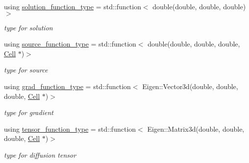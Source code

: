 \begin{DoxyCompactItemize}
\item 
\mbox{\label{classHArDCore3D_1_1HHO__Diffusion_a1fa6e03a7ffd6cb0c8a38b34eda2bd27}} 
using \hyperlink{classHArDCore3D_1_1HHO__Diffusion_a1fa6e03a7ffd6cb0c8a38b34eda2bd27}{solution\+\_\+function\+\_\+type} = std\+::function$<$ double(double, double, double)$>$
\begin{DoxyCompactList}\small\item\em type for solution \end{DoxyCompactList}\item 
\mbox{\label{classHArDCore3D_1_1HHO__Diffusion_a868fb4b88efbf1b77a712706d616b8d1}} 
using \hyperlink{classHArDCore3D_1_1HHO__Diffusion_a868fb4b88efbf1b77a712706d616b8d1}{source\+\_\+function\+\_\+type} = std\+::function$<$ double(double, double, double, \hyperlink{classHArDCore3D_1_1Cell}{Cell} $\ast$)$>$
\begin{DoxyCompactList}\small\item\em type for source \end{DoxyCompactList}\item 
\mbox{\label{classHArDCore3D_1_1HHO__Diffusion_afd0b6d7ab35bca58a5f7ec29afbba355}} 
using \hyperlink{classHArDCore3D_1_1HHO__Diffusion_afd0b6d7ab35bca58a5f7ec29afbba355}{grad\+\_\+function\+\_\+type} = std\+::function$<$ Eigen\+::\+Vector3d(double, double, double, \hyperlink{classHArDCore3D_1_1Cell}{Cell} $\ast$)$>$
\begin{DoxyCompactList}\small\item\em type for gradient \end{DoxyCompactList}\item 
\mbox{\label{classHArDCore3D_1_1HHO__Diffusion_a6792ca91d753720b28f458bdb3cedcd0}} 
using \hyperlink{classHArDCore3D_1_1HHO__Diffusion_a6792ca91d753720b28f458bdb3cedcd0}{tensor\+\_\+function\+\_\+type} = std\+::function$<$ Eigen\+::\+Matrix3d(double, double, double, \hyperlink{classHArDCore3D_1_1Cell}{Cell} $\ast$)$>$
\begin{DoxyCompactList}\small\item\em type for diffusion tensor \end{DoxyCompactList}\end{DoxyCompactItemize}
